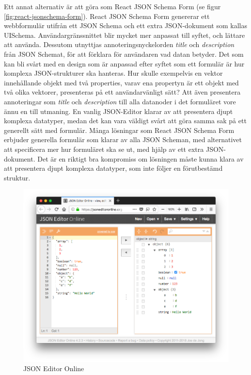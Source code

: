 Ett annat alternativ är att göra som React JSON Schema Form (se figur \ref{fig:react-jsonschema-form}). React JSON Schema Form genererar ett webbformulär utifrån ett JSON Schema och ett extra JSON-dokument som kallas UISchema. \cite{MozillaServices} Användargränssnittet blir mycket mer anpassat till syftet, och lättare att använda. Dessutom utnyttjas annoteringsnyckelorden \textit{title} och \textit{description} från JSON Schemat, för att förklara för användaren vad datan betyder. Det som kan bli svårt med en design som är anpassad efter syftet som ett formulär är hur komplexa JSON-strukturer ska hanteras. Hur skulle exempelvis en vektor innehållande objekt med två properties, varav ena propertyn är ett objekt med två olika vektorer, presenteras på ett användarvänligt sätt? Att även presentera annoteringar som \textit{title} och \textit{description} till alla datanoder i det formuläret vore ännu en till utmaning. En vanlig JSON-Editor klarar av att presentera djupt komplexa datatyper, medan det kan vara väldigt svårt att göra samma sak på ett generellt sätt med formulär. Många lösningar som React JSON Schema Form erbjuder generella formulär som klarar av alla JSON Scheman, med alternativet att specificera mer hur formuläret ska se ut, med hjälp av ett extra JSON-dokument. \cite{MozillaServices} Det är en riktigt bra kompromiss om lösningen måste kunna klara av att presentera djupt komplexa datatyper, som inte följer en förutbestämd struktur.

\begin{figure}
	\includegraphics[width=\textwidth]{./images/screenshot-json-editor.png}
	\vspace{-1.7em}
	\caption{JSON Editor Online \cite{DeJong2018}}
	\label{fig:json-editor}
\end{figure}


